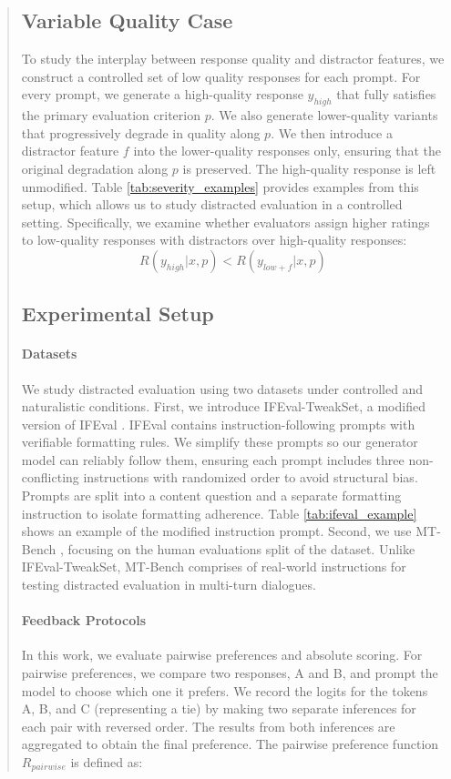 \documentclass{article}
\begin{document}
\begin{abstract}
\subsection{Variable Quality Case}
\label{subsec:variable}
To study the interplay between response quality and distractor features, we construct a controlled set of low quality responses for each prompt. For every prompt, we generate a high-quality response \(y_{high}\) that fully satisfies the primary evaluation criterion \(p\). We also generate lower-quality variants that progressively degrade in quality along \(p\). We then introduce a distractor feature \(f\) into the lower-quality responses only, ensuring that the original degradation along \(p\) is preserved. The high-quality response is left unmodified. Table \ref{tab:severity_examples} provides examples from this setup, which allows us to study distracted evaluation in a controlled setting. Specifically, we examine whether evaluators assign higher ratings to low-quality responses with distractors over high-quality responses:
\[
R(y_{high}|x,p) < R(y_{low+f}|x,p)
\]


\subsection{Experimental Setup}

\paragraph{Datasets}
We study distracted evaluation using two datasets under controlled and naturalistic conditions. First, we introduce IFEval-TweakSet, a modified version of IFEval \citep{zhou2023instructionfollowingevaluationlargelanguage}. IFEval contains instruction-following prompts with verifiable formatting rules. We simplify these prompts so our generator model can reliably follow them, ensuring each prompt includes three non-conflicting instructions with randomized order to avoid structural bias. Prompts are split into a content question and a separate formatting instruction to isolate formatting adherence. Table \ref{tab:ifeval_example} shows an example of the modified instruction prompt. 
Second, we use MT-Bench \citep{zheng2023judgingllmasajudgemtbenchchatbot}, focusing on the human evaluations split of the dataset. 
Unlike IFEval-TweakSet, MT-Bench comprises of real-world instructions for testing distracted evaluation in multi-turn dialogues.


\paragraph{Feedback Protocols} In this work, we evaluate pairwise preferences and absolute scoring. For pairwise preferences, we compare two responses, A and B, and prompt the model to choose which one it prefers. We record the logits for the tokens A, B, and C (representing a tie) by making two separate inferences for each pair with reversed order. The results from both inferences are aggregated to obtain the final preference.
The pairwise preference function \(R_{pairwise}\) is defined as:


\end{abstract}
\end{document}

